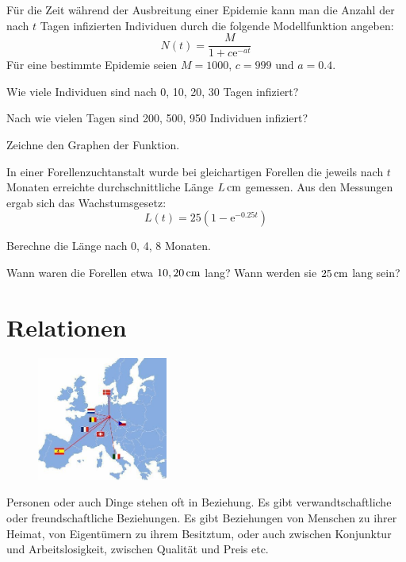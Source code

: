 \documentclass[%
11pt,%
twoside,%
titlepage,%
german,%
headsepline%
]{scrartcl}
\begin{document}
\begin{ueb}[Epidemie]
Für die Zeit während der Ausbreitung einer Epidemie kann man die Anzahl der nach $t$ Tagen infizierten Individuen durch die folgende Modellfunktion angeben:
$$N(t)=\frac{M}{1+c\mathrm{e}^{-at}}$$
Für eine bestimmte Epidemie seien $M= 1000$, $c=999$
und $a=0.4$.
\begin{enumeratea}
\item Wie viele Individuen sind nach 0, 10, 20, 30 Tagen infiziert?
\item Nach wie vielen Tagen sind 200, 500, 950 Individuen infiziert?
\item Zeichne den Graphen der Funktion.
\end{enumeratea}
\end{ueb}

\begin{ueb}[Forellen]
In einer Forellenzuchtanstalt wurde bei gleichartigen Forellen die jeweils nach $t$ Monaten erreichte durchschnittliche Länge $\unit[L]{cm}$ gemessen. Aus den Messungen ergab sich das \glqq Wachstumsgesetz\grqq:
$$L(t) =25(1- \mathrm{e}^{-0.25t})$$
\begin{enumeratea}
\item Berechne die Länge nach 0, 4, 8 Monaten.
\item Wann waren die Forellen etwa $\unit[10,20]{cm}$ lang?
Wann werden sie $\unit[25]{cm}$ lang sein?
\end{enumeratea}
\end{ueb}

\cleardoublepage

\appendix

\section{Relationen}
\begin{figure}
  \begin{center}
    \includegraphics[width=0.382\textwidth]{pictures/relationen}
  \end{center}
\end{figure}
Personen oder auch Dinge stehen oft in Beziehung. Es gibt verwandtschaftliche oder freundschaftliche Beziehungen. Es gibt Beziehungen von Menschen zu ihrer Heimat, von Eigent\"umern zu ihrem Besitztum, oder auch zwischen Konjunktur und Arbeitslosigkeit, zwischen Qualit\"at und Preis etc.
\end{document}
